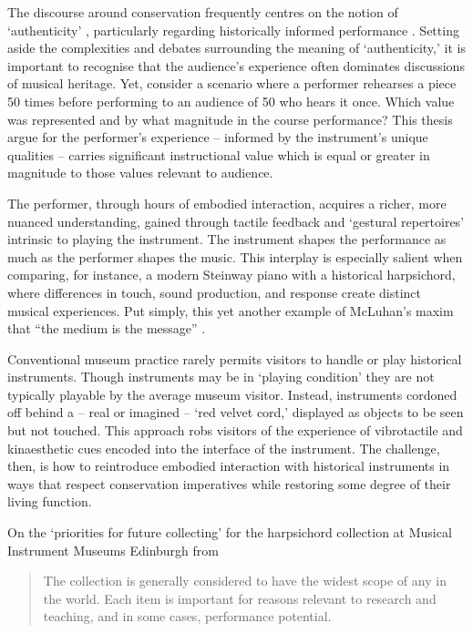 The discourse around conservation frequently centres on the notion of
`authenticity' \cite{pine_museums_2007, laurenson_authenticity_2006},
particularly regarding historically informed performance
\cite{davies_authenticity_2001}. Setting aside the complexities and debates
surrounding the meaning of `authenticity,' it is important to recognise that the
audience's experience often dominates discussions of musical heritage. Yet,
consider a scenario where a performer rehearses a piece 50 times before
performing to an audience of 50 who hears it once. Which value was represented
and by what magnitude in the course performance? This thesis argue for the
performer’s experience -- informed by the instrument’s unique qualities --
carries significant instructional value which is equal or greater in magnitude
to those values relevant to audience. 

The performer, through hours of embodied interaction, acquires a richer, more
nuanced understanding, gained through tactile feedback and `gestural
repertoires' \cite[][]{levinson_music_1990} intrinsic to playing the instrument.
The instrument shapes the performance as much as the performer shapes the music.
This interplay is especially salient when comparing, for instance, a modern
Steinway piano with a historical harpsichord, where differences in touch, sound
production, and response create distinct musical experiences. Put simply, this
yet another example of McLuhan’s maxim that ``the medium is the message''
\cite[][]{mcluhan_understanding_1964}.

Conventional museum practice rarely permits visitors to handle or play
historical instruments. Though instruments may be in `playing condition' they
are not typically playable by the average museum visitor. Instead, instruments
cordoned off behind a -- real or imagined -- `red velvet cord,'
\cite{mcalpine_sampling_2014} displayed as objects to be seen but not touched.
This approach robs visitors of the experience of vibrotactile and kinaesthetic
cues encoded into the interface of the instrument. The challenge, then, is how
to reintroduce embodied interaction with historical instruments in ways that
respect conservation imperatives while restoring some degree of their living
function.

On the `priorities for future collecting' for the harpsichord collection at
Musical Instrument Museums Edinburgh from \cite{uoe_collections_2020}

\begin{quotation}
    The collection is generally considered to have the widest scope of any in
    the world. Each item is important for reasons relevant to research and
    teaching, and in some cases, performance potential. 
\end{quotation}

